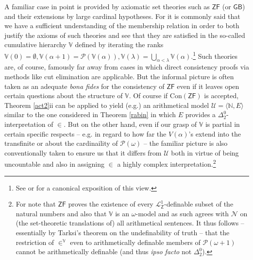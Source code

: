 \documentclass[11pt,fleqn,leqno]{article}
\begin{document}
A familiar case in point is provided by axiomatic set theories such as $\mathsf{ZF}$ (or $\mathsf{GB}$) and their extensions by large cardinal hypotheses.  For it is commonly said that we have a sufficient understanding of the membership relation in order to both justify the axioms of such theories and see that they are satisfied in the so-called cumulative hierarchy $\mathbb{V}$ defined by iterating the ranks $\mathbb{V}(0) = \emptyset, \mathbb{V}(\alpha + 1) = \mathcal{P}(\mathbb{V}(\alpha)), \mathbb{V}(\lambda) = \bigcup_{\alpha < \lambda} \mathbb{V}(\alpha)$.\footnote{See \citep{Kreisel1967} or \citep{Isaacson2011a} for a canonical exposition of this view.}   Such theories are, of course, famously far away from cases in which direct consistency proofs via methods like cut elimination are applicable.  But the informal picture is often taken as an adequate \textsl{bona fides} for the consistency of $\mathsf{ZF}$ even if it leaves open certain questions about the structure of $\mathbb{V}$.  Of course if $\mathrm{Con}(\mathsf{ZF})$ is accepted, Theorem \ref{act2}ii can be applied to yield (e.g.) an arithmetical model $\mathcal{U} = \langle \mathbb{N},E \rangle$ similar to the one considered in Theorem \ref{rabin} in which $E$ provides a $\Delta^0_2$-interpretation of $\in$.   But on the other hand, even if our grasp of $\mathbb{V}$ is partial in certain specific respects -- e.g. in regard to how far the $V(\alpha)$'s extend into the transfinite or about the cardinaility of $\mathcal{P}(\omega)$ -- the familiar picture is also conventionally taken to ensure us that it differs from $\mathcal{U}$ both in virtue of being uncountable and also in assigning $\in$  a highly complex interpretation.\footnote{For note that $\mathsf{ZF}$ proves the existence of every $\mathcal{L}^1_{\mathsf{Z}}$-definable subset of the natural numbers and also that $\mathbb{V}$ is an $\omega$-model and as such agrees with $\mathcal{N}$ on (the set-theoretic translations of) all arithmetical sentences.   It thus follows -- essentially by Tarksi's theorem on the undefinability of truth -- that the restriction of $\in^{\mathbb{V}}$ even to arithmetically definable members of $\mathcal{P}(\omega+1)$ cannot be arithmetically definable (and thus \textsl{ipso facto} not $\Delta^0_2$).} 
\end{document}
